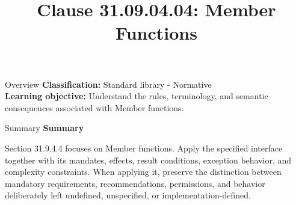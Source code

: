 \documentclass[10pt,letterpaper]{article}
\title{Clause 31.09.04.04: Member Functions}
\author{}
\date{}
\begin{document}
\maketitle
\begin{CornellOverviewBox}{Overview}
\textbf{Classification:} Standard library - Normative\\[2pt]
\textbf{Learning objective:} Understand the rules, terminology, and semantic consequences associated with Member functions.
\end{CornellOverviewBox}\begin{CornellSummaryBox}{Summary}
{\sffamily\bfseries\color{Accent} Summary}\par\vspace{3pt}Section 31.9.4.4 focuses on Member functions. Apply the specified interface together with its mandates, effects, result conditions, exception behavior, and complexity constraints. When applying it, preserve the distinction between mandatory requirements, recommendations, permissions, and behavior deliberately left undefined, unspecified, or implementation-defined.
\end{CornellSummaryBox}
\end{document}
